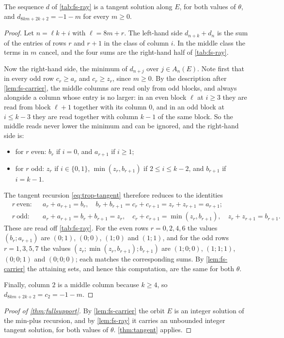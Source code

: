 \begin{lemma}
\label{lem:fs-ray}
The sequence $d$ of \autoref{tab:fs-ray} is a tangent solution along $E$, for both
values of $\theta$, and $d_{8km+2k+2}=-1-m$ for every $m\ge0$.
\end{lemma}

\begin{proof}
Let $n=\ell k+i$ with $\ell=8m+r$. The left-hand side $d_{n+k}+d_n$ is the sum of
the entries of rows $r$ and $r+1$ in the class of column $i$. In the middle class
the terms in $m$ cancel, and the four sums are the right-hand half of
\autoref{tab:fs-ray}.

Now the right-hand side, the minimum of $d_{n+j}$ over $j\in A_n(E)$. Note first
that in every odd row $c_r\ge a_r$ and $c_r\ge z_r$, since $m\ge0$. By the
description after \autoref{lem:fs-carrier}, the middle columns are read only
from odd blocks, and always alongside a column whose entry is no larger: in an
even block $\ell$ at $i\ge3$ they are read from block $\ell+1$ together with its
column $0$, and in an odd block at $i\le k-3$ they are read together with column
$k-1$ of the same block. So the middle reads never lower the minimum and can be ignored,
and the right-hand side is:
\begin{itemize}
\item for $r$ even: $b_r$ if $i=0$, and $a_{r+1}$ if $i\ge1$;
\item for $r$ odd: $z_r$ if $i\in\{0,1\}$, $\min(z_r,b_{r+1})$ if
$2\le i\le k-2$, and $b_{r+1}$ if $i=k-1$.
\end{itemize}
The tangent recursion \eqref{eq:trop-tangent} therefore reduces to the identities
\[
\begin{aligned}
&r\ \text{even:}&& a_r+a_{r+1}=b_r,\quad
b_r+b_{r+1}=c_r+c_{r+1}=z_r+z_{r+1}=a_{r+1};\\
&r\ \text{odd:}&& a_r+a_{r+1}=b_r+b_{r+1}=z_r,\quad
c_r+c_{r+1}=\min(z_r,b_{r+1}),\quad z_r+z_{r+1}=b_{r+1}.
\end{aligned}
\]
These are read off \autoref{tab:fs-ray}. For the even rows $r=0,2,4,6$ the values
$(b_r;a_{r+1})$ are $(0;1)$, $(0;0)$, $(1;0)$ and $(1;1)$, and for the odd rows
$r=1,3,5,7$ the values $(z_r;\min(z_r,b_{r+1});b_{r+1})$ are $(1;0;0)$,
$(1;1;1)$, $(0;0;1)$ and $(0;0;0)$; each matches the corresponding sums. By
\autoref{lem:fs-carrier} the attaining sets, and hence this computation, are the
same for both $\theta$.

Finally, column $2$ is a middle column because $k\ge4$, so
$d_{8km+2k+2}=c_2=-1-m$.
\end{proof}

\begin{proof}[Proof of \autoref{thm:fullsupport}]
By \autoref{lem:fs-carrier} the orbit $E$ is an integer solution of the min-plus
recursion, and by \autoref{lem:fs-ray} it carries an unbounded integer tangent
solution, for both values of $\theta$. \autoref{thm:tangent} applies.
\end{proof}
